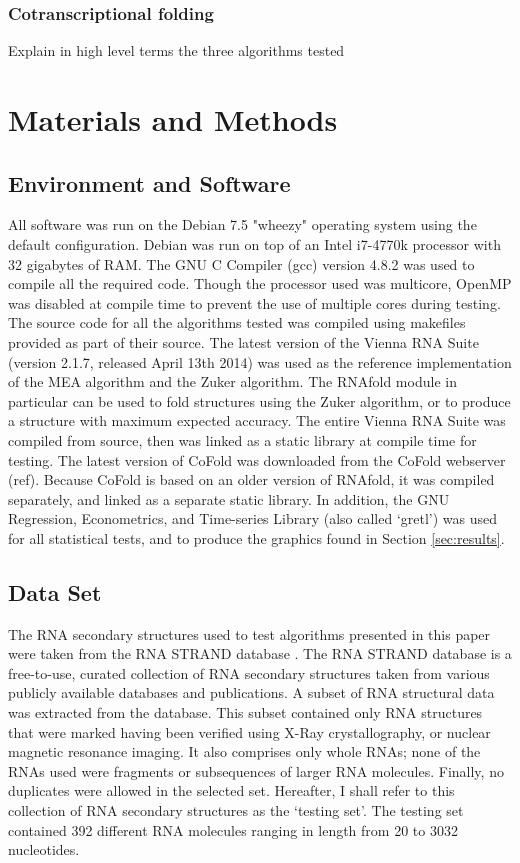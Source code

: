 \documentclass[12pt, a4paper]{article}
\begin{document}
\subsubsection{Cotranscriptional folding}
Explain in high level terms the three algorithms tested

\section{Materials and Methods}
\subsection{Environment and Software}
All software was run on the Debian 7.5 "wheezy" operating system using the default configuration. Debian was run on top of an Intel i7-4770k processor with 32 gigabytes of RAM. The GNU C Compiler (gcc) version 4.8.2 was used to compile all the required code. Though the processor used was multicore, OpenMP was disabled at compile time to prevent the use of multiple cores during testing. The source code for all the algorithms tested was compiled using makefiles provided as part of their source. The latest version of the Vienna RNA Suite (version 2.1.7, released April 13th 2014) was used as the reference implementation of the MEA algorithm and the Zuker algorithm. The RNAfold module in particular can be used to fold structures using the Zuker algorithm, or to produce a structure with maximum expected accuracy. The entire Vienna RNA Suite was compiled from source, then was linked as a static library at compile time for testing. The latest version of CoFold was downloaded from the CoFold webserver (ref). Because CoFold is based on an older version of RNAfold, it was compiled separately, and linked as a separate static library. In addition, the GNU Regression, Econometrics, and Time-series Library (also called `gretl') was used for all statistical tests, and to produce the graphics found in Section \ref{sec:results}.

\subsection{Data Set}
The RNA secondary structures used to test algorithms presented in this paper were taken from the RNA STRAND database \cite{andronescu2008rna}. The RNA STRAND database is a free-to-use, curated collection of RNA secondary structures taken from various publicly available databases and publications. A subset of RNA structural data was extracted from the database. This subset contained only RNA structures that were marked having been verified using X-Ray crystallography, or nuclear magnetic resonance imaging. It also comprises only whole RNAs; none of the RNAs used were fragments or subsequences of larger RNA molecules. Finally, no duplicates were allowed in the selected set. Hereafter, I shall refer to this collection of RNA secondary structures as the `testing set'. The testing set contained 392 different RNA molecules ranging in length from 20 to 3032 nucleotides.
\end{document}
